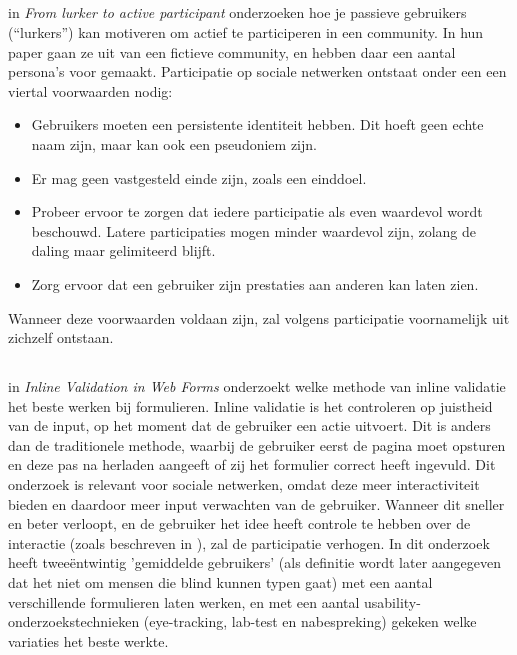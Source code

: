 \documentclass[a4paper, 10pt, pdftex]{report}
\begin{document}
    \subsection{\cite{Sloep2009}}

    in \emph{From lurker to active participant} onderzoeken \citeauthor{Sloep2009} hoe je passieve gebruikers (``lurkers'') kan motiveren om actief te participeren in een community. In hun paper gaan ze uit van een fictieve community, en hebben daar een aantal persona's voor gemaakt. Participatie op sociale netwerken ontstaat onder een een viertal voorwaarden nodig:
    \begin{itemize}
    \item Gebruikers moeten een persistente identiteit hebben. Dit hoeft geen echte naam zijn, maar kan ook een pseudoniem zijn.
    \item Er mag geen vastgesteld einde zijn, zoals een einddoel.
    \item Probeer ervoor te zorgen dat iedere participatie als even waardevol wordt beschouwd. Latere participaties mogen minder waardevol zijn, zolang de daling maar gelimiteerd blijft.
    \item Zorg ervoor dat een gebruiker zijn prestaties aan anderen kan laten zien.
  \end{itemize}
    Wanneer deze voorwaarden voldaan zijn, zal volgens \citeauthor{Sloep2009} participatie voornamelijk uit zichzelf ontstaan.

  \subsection{\cite{Wroblewski2009}}
    in \emph{Inline Validation in Web Forms} onderzoekt \citeauthor{Wroblewski2009} welke methode van inline validatie het beste werken bij formulieren. Inline validatie is het controleren op juistheid van de input, op het moment dat de gebruiker een actie uitvoert. Dit is anders dan de traditionele methode, waarbij de gebruiker eerst de pagina moet opsturen en deze pas na herladen aangeeft of zij het formulier correct heeft ingevuld. Dit onderzoek is relevant voor sociale netwerken, omdat deze meer interactiviteit bieden en daardoor meer input verwachten van de gebruiker. Wanneer dit sneller en beter verloopt, en de gebruiker het idee heeft controle te hebben over de interactie (zoals beschreven in \cite{Beenen2004}), zal de participatie verhogen. In dit onderzoek heeft \citeauthor{Wroblewski2009} twee\"{e}ntwintig 'gemiddelde gebruikers'  (als definitie wordt later aangegeven dat het niet om mensen die blind kunnen typen gaat) met een aantal verschillende formulieren laten werken, en met een aantal usability-onderzoekstechnieken (eye-tracking, lab-test en nabespreking) gekeken welke variaties het beste werkte.
\end{document}
